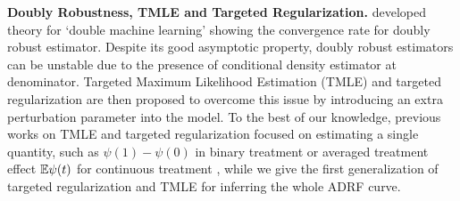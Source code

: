 \textbf{Doubly Robustness, TMLE and Targeted Regularization.}
\citet{chernozhukov2017double, chernozhukov2018double} developed theory for `double machine learning' showing the convergence rate for doubly robust estimator. Despite its good asymptotic property, doubly robust estimators can be unstable due to the presence of conditional density estimator at denominator. Targeted Maximum Likelihood Estimation (TMLE) \citep{van2011targeted} and targeted regularization \citep{shi2019adapting} are then proposed to overcome this issue by introducing an extra perturbation parameter into the model. To the best of our knowledge, previous works on TMLE and targeted regularization focused on estimating a single quantity, such as $\psi(1)-\psi(0)$ in binary treatment \citep{shi2019adapting, van2011targeted} or averaged treatment effect $\mathbb{E} \psi(t)$ for continuous treatment \citep{kennedy2017non}, while we give the first generalization of targeted regularization and TMLE for inferring the whole ADRF curve.



